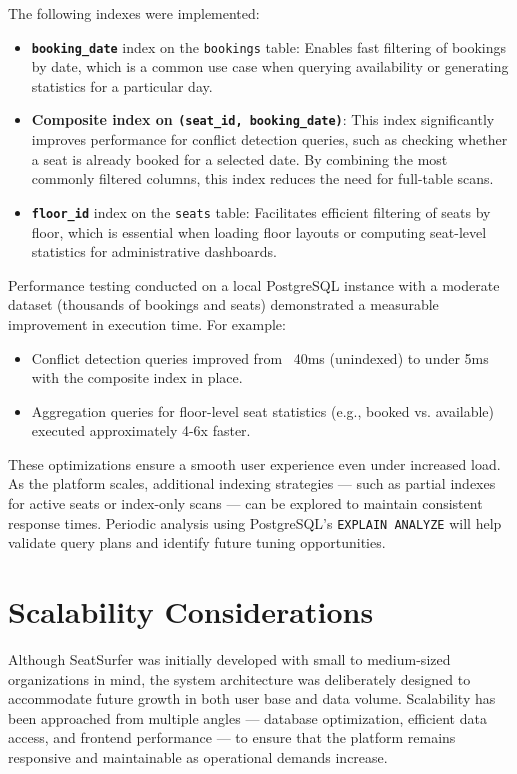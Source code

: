 \documentclass[12pt,a4paper]{report}
\begin{document}
The following indexes were implemented:

\begin{itemize}
    \item \textbf{\texttt{booking\_date}} index on the \texttt{bookings} table: Enables fast filtering of bookings by date, which is a common use case when querying availability or generating statistics for a particular day.
    
    \item \textbf{Composite index on \texttt{(seat\_id, booking\_date)}}: This index significantly improves performance for conflict detection queries, such as checking whether a seat is already booked for a selected date. By combining the most commonly filtered columns, this index reduces the need for full-table scans.
    
    \item \textbf{\texttt{floor\_id}} index on the \texttt{seats} table: Facilitates efficient filtering of seats by floor, which is essential when loading floor layouts or computing seat-level statistics for administrative dashboards.
\end{itemize}

Performance testing conducted on a local PostgreSQL instance with a moderate dataset (thousands of bookings and seats) demonstrated a measurable improvement in execution time. For example:

\begin{itemize}
    \item Conflict detection queries improved from ~40ms (unindexed) to under 5ms with the composite index in place.
    \item Aggregation queries for floor-level seat statistics (e.g., booked vs. available) executed approximately 4-6x faster.
\end{itemize}

These optimizations ensure a smooth user experience even under increased load. As the platform scales, additional indexing strategies — such as partial indexes for active seats or index-only scans — can be explored to maintain consistent response times. Periodic analysis using PostgreSQL's \texttt{EXPLAIN ANALYZE} will help validate query plans and identify future tuning opportunities.

\section{Scalability Considerations}

Although SeatSurfer was initially developed with small to medium-sized organizations in mind, the system architecture was deliberately designed to accommodate future growth in both user base and data volume. Scalability has been approached from multiple angles — database optimization, efficient data access, and frontend performance — to ensure that the platform remains responsive and maintainable as operational demands increase.
\end{document}

